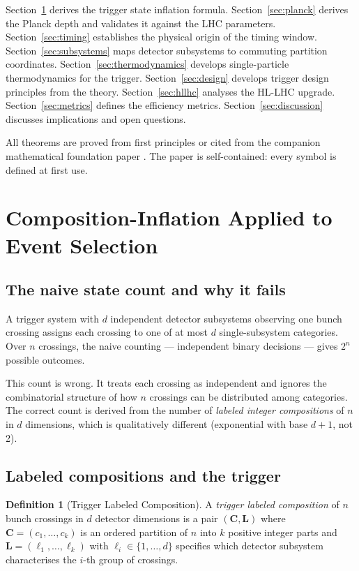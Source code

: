 \documentclass[twocolumn,10pt,a4paper]{article}
\theoremstyle{thmstyle}
\theoremstyle{definition}
\newtheorem{definition}[theorem]{Definition}
\theoremstyle{remark}
\begin{document}
Section~\ref{sec:inflation} derives the trigger state inflation formula.
Section~\ref{sec:planck} derives the Planck depth and validates it against
the LHC parameters. Section~\ref{sec:timing} establishes the physical origin
of the timing window. Section~\ref{sec:subsystems} maps detector subsystems
to commuting partition coordinates. Section~\ref{sec:thermodynamics} develops
single-particle thermodynamics for the trigger. Section~\ref{sec:design}
develops trigger design principles from the theory.
Section~\ref{sec:hllhc} analyses the HL-LHC upgrade.
Section~\ref{sec:metrics} defines the efficiency metrics.
Section~\ref{sec:discussion} discusses implications and open questions.

All theorems are proved from first principles or cited from the companion
mathematical foundation paper \citep{companion:math}. The paper is
self-contained: every symbol is defined at first use.

\section{Composition-Inflation Applied to Event Selection}
\label{sec:inflation}

\subsection{The naive state count and why it fails}

A trigger system with $d$ independent detector subsystems observing one bunch
crossing assigns each crossing to one of at most $d$ single-subsystem
categories. Over $n$ crossings, the naive counting — independent binary
decisions — gives $2^n$ possible outcomes.

This count is wrong. It treats each crossing as independent and ignores the
combinatorial structure of how $n$ crossings can be distributed among
categories. The correct count is derived from the number of \emph{labeled
integer compositions} of $n$ in $d$ dimensions, which is qualitatively
different (exponential with base $d+1$, not 2).

\subsection{Labeled compositions and the trigger}

\begin{definition}[Trigger Labeled Composition]
A \emph{trigger labeled composition} of $n$ bunch crossings in $d$ detector
dimensions is a pair $(\mathbf{C}, \mathbf{L})$ where
$\mathbf{C} = (c_1, \ldots, c_k)$ is an ordered partition of $n$ into $k$
positive integer parts and $\mathbf{L} = (\ell_1, \ldots, \ell_k)$ with
$\ell_i \in \{1, \ldots, d\}$ specifies which detector subsystem characterises
the $i$-th group of crossings.
\end{definition}
\end{document}
